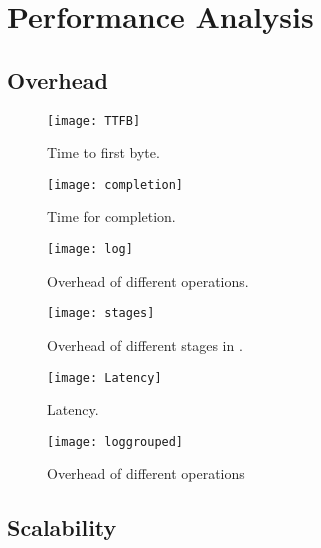 \section{Performance Analysis}
\label{sec:performance}

\subsection{\system{} Overhead}

\begin{figure}[t!]
\centering
\texttt{[image: TTFB]}
\caption{Time to first byte.}
\label{fig:ttfb}
\end{figure}

\begin{figure}[t!]
\centering
\texttt{[image: completion]}
\caption{Time for completion.}
\label{fig:completion}
\end{figure}

\begin{figure*}[t!]
\centering
\texttt{[image: log]}
\caption{Overhead of different \system{} operations.}
\label{fig:log}
\end{figure*}

\begin{figure*}[t!]
\centering
\texttt{[image: stages]}
\caption{Overhead of different stages in \system{}.}
\label{fig:stages}
\end{figure*}

\begin{figure}[t!]
\centering
\texttt{[image: Latency]}
\caption{Latency.}
\label{fig:latency}
\end{figure}

\begin{figure}[t!]
\centering
\texttt{[image: loggrouped]}
\caption{Overhead of different operations}
\label{fig:overhead2}
\end{figure}

\subsection{Scalability}
